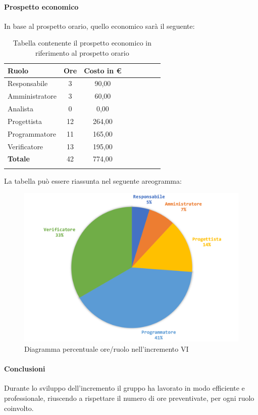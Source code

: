 			\paragraph{Prospetto economico}
			In base al prospetto orario, quello economico sarà il seguente: 
			\begin{longtable}{|l|c|c|c|c|c|c|c|}
				\hline
				\rowcolor{lighter-grayer}
				\textbf{Ruolo} & \textbf{Ore} & \textbf{Costo in € } \\
				\hline
				\endfirsthead
				
				\hline
				Responsabile 	    & 3 & 90,00\\
				\hline 
				\hline
				Amministratore	   & 3 & 60,00\\
				\hline
				\hline
				Analista 				& 0 & 0,00\\
				\hline
				\hline
				Progettista 		   & 12 & 264,00\\
				\hline
				\hline
				Programmatore 	  & 11 & 165,00\\
				\hline
				\hline
				Verificatore 		   & 13 & 195,00\\
				\hline
				\textbf{Totale} 	 & 42 & 774,00\\
				\hline
				\caption{Tabella contenente il prospetto economico in riferimento al prospetto orario}
			\end{longtable}
		
				La tabella può essere riassunta nel seguente areogramma:
			\begin{figure}[H]
				\centering
				\includegraphics[width=0.8\linewidth]{./images/preventivo/incremento6-2.png}
				\caption{Diagramma percentuale ore/ruolo nell'incremento VI}
				\label{fig:consuntivo diagramma costi ruolo incremento VI}
			\end{figure}
			\pagebreak
			\paragraph{Conclusioni}
				Durante lo sviluppo dell'incremento il gruppo ha lavorato in modo efficiente e professionale, riuscendo a rispettare il numero di ore preventivate, per ogni ruolo coinvolto. 
			
